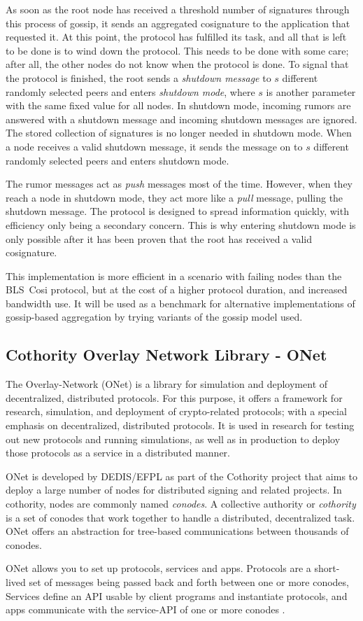 As soon as the root node has received a threshold number of signatures through this process of gossip, it sends an aggregated cosignature to the application that requested it.
At this point, the protocol has fulfilled its task, and all that is left to be done is to wind down the protocol.
This needs to be done with some care; after all, the other nodes do not know when the protocol is done.
To signal that the protocol is finished, the root sends a \emph{shutdown message} to $s$ different randomly selected peers and enters \emph{shutdown mode}, where $s$ is another parameter with the same fixed value for all nodes.
In shutdown mode, incoming rumors are answered with a shutdown message and incoming shutdown messages are ignored.
The stored collection of signatures is no longer needed in shutdown mode.
When a node receives a valid shutdown message, it sends the message on to $s$ different randomly selected peers and enters shutdown mode.

The rumor messages act as \emph{push} messages most of the time.
However, when they reach a node in shutdown mode, they act more like a \emph{pull} message, pulling the shutdown message. The protocol is designed to spread information quickly, with efficiency only being a secondary concern. This is why entering shutdown mode is only possible after it has been proven that the root has received a valid cosignature.

This implementation is more efficient in a scenario with failing nodes than the BLS~Cosi protocol, but at the cost of a higher protocol duration, and increased bandwidth use. It will be used as a benchmark for alternative implementations of gossip-based aggregation by trying variants of the gossip model used.

\subsection{Cothority Overlay Network Library - ONet}

The Overlay-Network (ONet) is a library for simulation and deployment of decentralized, distributed protocols. For this purpose, it offers a framework for research, simulation, and deployment of crypto-related protocols; with a special emphasis on decentralized, distributed protocols. It is used in research for testing out new protocols and running simulations, as well as in production to deploy those protocols as a service in a distributed manner.

ONet is developed by DEDIS/EFPL as part of the Cothority project that aims to deploy a large number of nodes for distributed signing and related projects. In cothority, nodes are commonly named \emph{conodes}. A collective authority or \emph{cothority} is a set of conodes that work together to handle a distributed, decentralized task. ONet offers an abstraction for tree-based communications between thousands of conodes.

ONet allows you to set up protocols, services and apps.
Protocols are a short-lived set of messages being passed back and forth between one or more conodes,
Services define an API usable by client programs and instantiate protocols, and apps communicate with the service-API of one or more conodes \cite{ONet}.
